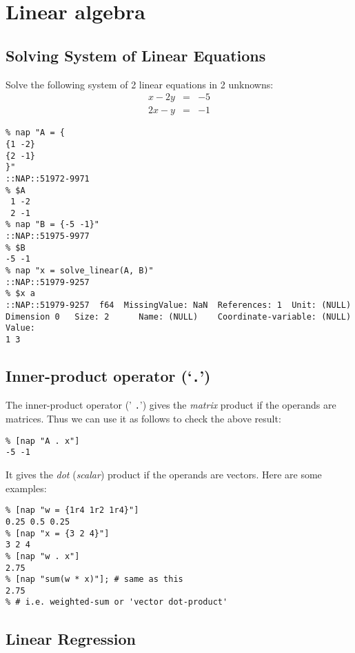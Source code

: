 
\section{Linear algebra}

\subsection{Solving System of Linear Equations}

Solve the following system
  of 2 linear equations in 2 unknowns:
\begin{eqnarray*}
x - 2 y & = & -5
\\
2 x - y & = & -1
\end{eqnarray*}
  \begin{verbatim}
% nap "A = {
{1 -2}
{2 -1}
}"
::NAP::51972-9971
% $A
 1 -2
 2 -1
% nap "B = {-5 -1}"
::NAP::51975-9977
% $B
-5 -1
% nap "x = solve_linear(A, B)"
::NAP::51979-9257
% $x a
::NAP::51979-9257  f64  MissingValue: NaN  References: 1  Unit: (NULL)
Dimension 0   Size: 2      Name: (NULL)    Coordinate-variable: (NULL)
Value:
1 3
\end{verbatim}

\subsection{Inner-product operator (`\texttt{.}')}

The inner-product operator (' 
  \texttt{.}') gives the 
  \textit{matrix} product if the operands are matrices. Thus we can use
  it as follows to check the above result:
  \begin{verbatim}
% [nap "A . x"]
-5 -1
\end{verbatim}

It gives the 
  \textit{dot} (\textit{scalar}) product if the operands are vectors. Here are some
  examples:
  \begin{verbatim}
% [nap "w = {1r4 1r2 1r4}"]
0.25 0.5 0.25
% [nap "x = {3 2 4}"]
3 2 4
% [nap "w . x"]
2.75
% [nap "sum(w * x)"]; # same as this
2.75
% # i.e. weighted-sum or 'vector dot-product'
\end{verbatim}

\subsection{Linear Regression}

